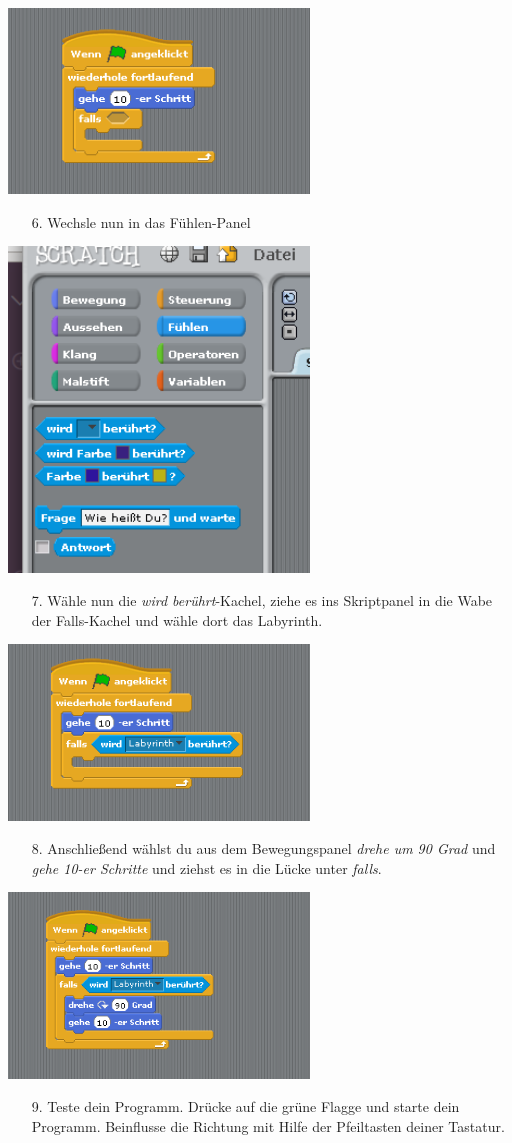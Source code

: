 \includegraphics[width=0.6\textwidth]{images/aufgabe2_automat3.png}
\begin{itemize}
\item[6.] Wechsle nun in das Fühlen-Panel
\end{itemize}
\includegraphics[width=0.6\textwidth]{images/aufgabe2_fuehlen.png}
\begin{itemize}
\item[7.] Wähle nun die \textit{wird berührt}-Kachel, ziehe es ins Skriptpanel in die Wabe der Falls-Kachel und wähle dort das Labyrinth. 
\end{itemize}
\includegraphics[width=0.6\textwidth]{images/aufgabe2_automat4.png}
\begin{itemize}
\item[8.] Anschließend wählst du aus dem Bewegungspanel \textit{drehe um 90 Grad} und \textit{gehe 10-er Schritte} und ziehst es in die Lücke unter \textit{falls}.
\end{itemize}
\includegraphics[width=0.6\textwidth]{images/aufgabe2_automat5.png}
\begin{itemize}
\item[9.] Teste dein Programm. Drücke auf die grüne Flagge und starte dein Programm. Beinflusse die Richtung mit Hilfe der Pfeiltasten deiner Tastatur.
\end{itemize}
